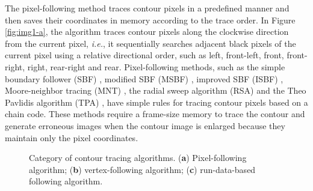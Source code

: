 \documentclass[sensors,article,accept,moreauthors,pdftex,10pt,a4paper]{mdpi}
\begin{document}
The pixel-following method traces contour pixels in a predefined manner and then saves their coordinates in memory according to the trace order. In Figure \ref{fig:img1-a}, the algorithm traces contour pixels along the clockwise direction from the current pixel, \emph{i.e.}, it sequentially searches adjacent black pixels of the current pixel using a relative directional order, such as left, front-left, front, front-right, right, rear-right and rear. Pixel-following methods, such as the simple boundary follower (SBF) \cite{Pitas2000Digital,Das1990Bivariate,Papert1973Uses}, modified SBF (MSBF) \cite{Gose1996Pattern}, improved SBF (ISBF) \cite{Cheong2006Improved}, Moore-neighbor tracing (MNT) \cite{Toussaint????Grids}, the radial sweep algorithm (RSA) \cite{Mirante1982Radial} and the Theo Pavlidis algorithm (TPA) \cite{Pavlidis2012Algorithms}, have simple rules for tracing contour pixels based on a chain code. These methods require a frame-size memory to trace the contour and generate erroneous images when the contour image is enlarged \cite{Miyatake1997Contour} because they maintain only the pixel coordinates.
\begin{figure}[H]
	\centering
	 
	\caption{Category of contour tracing algorithms. (\textbf{a}) Pixel-following algorithm; (\textbf{b}) vertex-following algorithm; (\textbf{c}) run-data-based following algorithm.}
	\label{fig:image1}
\end{figure}
\end{document}
